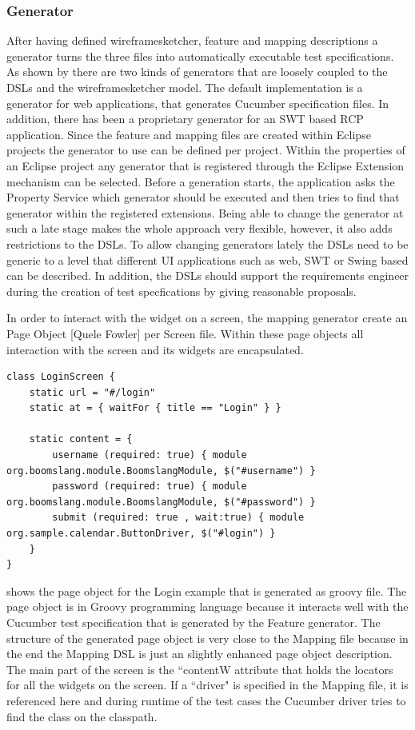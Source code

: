 \documentclass{sig-alternate-05-2015}
\begin{document}
\subsubsection{Generator}
After having defined wireframesketcher, feature and mapping descriptions a generator turns the three files into automatically executable test specifications.
As shown by  there are two kinds of generators that are loosely coupled to the DSLs and the wireframesketcher model.
The default implementation is a generator for web applications, that generates Cucumber specification files.
In addition, there has been a proprietary generator for an SWT based RCP application.
Since the feature and mapping files are created within Eclipse projects the generator to use can be defined per project.
Within the properties of an Eclipse project any generator that is registered through the Eclipse Extension mechanism can be selected.
Before a generation starts, the application asks the Property Service which generator should be executed and then tries to find that generator within the registered extensions.
Being able to change the generator at such a late stage makes the whole approach very flexible, however, it also adds restrictions to the DSLs.
To allow changing generators lately the DSLs need to be generic to a level that different UI applications such as web, SWT or Swing based can be described.
In addition, the DSLs should support the requirements engineer during the creation of test specfications by giving reasonable proposals.

In order to interact with the widget on a screen, the mapping generator create an Page Object [Quele Fowler] per Screen file.
Within these page objects all interaction with the screen and its widgets are encapsulated.

\begin{lstlisting}[captionpos=b, caption=Generated Page Object, label={lst:MappingGenerated}, language=dsl]
class LoginScreen {
	static url = "#/login"
	static at = { waitFor { title == "Login" } }
	
	static content = {
		username (required: true) { module org.boomslang.module.BoomslangModule, $("#username") }
		password (required: true) { module org.boomslang.module.BoomslangModule, $("#password") }
		submit (required: true , wait:true) { module org.sample.calendar.ButtonDriver, $("#login") }
	}
}
\end{lstlisting}

 shows the page object for the Login example that is generated as groovy file.
The page object is in Groovy programming language because it interacts well with the Cucumber test specification that is generated by the Feature generator.
The structure of the generated page object is very close to the Mapping file because in the end the Mapping DSL is just an slightly enhanced page object description.
The main part of the screen is the ``contentW attribute that holds the locators for all the widgets on the screen.
If a ``driver" is specified in the Mapping file, it is referenced here and during runtime of the test cases the Cucumber driver tries to find the class on the classpath.
\end{document}
